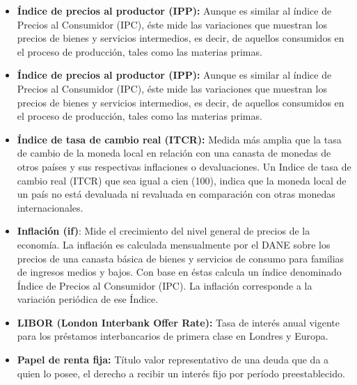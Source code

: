 \begin{itemize}
\item{\textbf{Índice de precios al productor (IPP): }}
Aunque es similar al índice de Precios al Consumidor (IPC), éste mide las variaciones que muestran los precios de bienes y servicios intermedios, es decir, de aquellos consumidos en el proceso de producción, tales como las materias primas.

\item{\textbf{Índice de precios al productor (IPP): }}
Aunque es similar al índice de Precios al Consumidor (IPC), éste mide las variaciones que muestran los precios de bienes y servicios intermedios, es decir, de aquellos consumidos en el proceso de producción, tales como las materias primas.\\

\item {\textbf{Índice de tasa de cambio real (ITCR): }}
Medida más amplia que la tasa de cambio de la moneda local en relación con una canasta de monedas de otros países y sus respectivas inflaciones o devaluaciones. Un Indice de tasa de cambio real (ITCR) que sea igual a cien (100), indica que la moneda local de un país no está devaluada ni revaluada en comparación con otras monedas internacionales. \\

\item {\textbf{Inflación (if)}: }
Mide el crecimiento del nivel general de precios de la economía. La inflación es calculada mensualmente por el DANE sobre los precios de una canasta básica de bienes y servicios de consumo para familias de ingresos medios y bajos. Con base en éstas calcula un índice denominado Índice de Precios al Consumidor (IPC). La inflación corresponde a la variación periódica de ese Índice.\\


\item {\textbf{LIBOR (London Interbank Offer Rate): }}
Tasa de interés anual vigente para los préstamos interbancarios de primera clase en Londres y Europa.\\

\item {\textbf{Papel de renta fija: }}
Título valor representativo de una deuda que da a quien lo posee, el derecho a recibir un interés fijo por período preestablecido.


\end{itemize}
